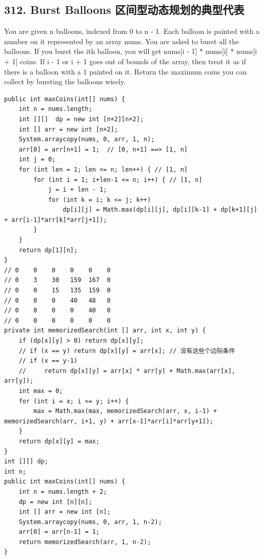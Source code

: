 \documentclass[9pt, b5paaper]{book}
\begin{document}
\subsection{312. Burst Balloons 区间型动态规划的典型代表}
\label{sec-1-3-3}
You are given n balloons, indexed from 0 to n - 1. Each balloon is painted with a number on it represented by an array nums. You are asked to burst all the balloons.
If you burst the ith balloon, you will get nums[i - 1] * nums[i] * nums[i + 1] coins. If i - 1 or i + 1 goes out of bounds of the array, then treat it as if there is a balloon with a 1 painted on it.
Return the maximum coins you can collect by bursting the balloons wisely.
\begin{verbatim}
public int maxCoins(int[] nums) {
    int n = nums.length;
    int [][]  dp = new int [n+2][n+2];
    int [] arr = new int [n+2];
    System.arraycopy(nums, 0, arr, 1, n);
    arr[0] = arr[n+1] = 1;  // [0, n+1] ==> [1, n]
    int j = 0;
    for (int len = 1; len <= n; len++) { // [1, n]
        for (int i = 1; i+len-1 <= n; i++) { // [1, n]
            j = i + len - 1;
            for (int k = i; k <= j; k++) 
                dp[i][j] = Math.max(dp[i][j], dp[i][k-1] + dp[k+1][j] + arr[i-1]*arr[k]*arr[j+1]);
        }
    }
    return dp[1][n];
}
// 0    0    0    0    0    0
// 0    3    30   159  167  0
// 0    0    15   135  159  0
// 0    0    0    40   48   0
// 0    0    0    0    40   0
// 0    0    0    0    0    0
private int memorizedSearch(int [] arr, int x, int y) {
    if (dp[x][y] > 0) return dp[x][y];
    // if (x == y) return dp[x][y] = arr[x]; // 没有这些个边际条件
    // if (x == y-1) 
    //     return dp[x][y] = arr[x] * arr[y] + Math.max(arr[x], arr[y]);
    int max = 0;
    for (int i = x; i <= y; i++) {
        max = Math.max(max, memorizedSearch(arr, x, i-1) + memorizedSearch(arr, i+1, y) + arr[x-1]*arr[i]*arr[y+1]);
    }
    return dp[x][y] = max;
}
int [][] dp;
int n;
public int maxCoins(int[] nums) {
    int n = nums.length + 2;
    dp = new int [n][n];
    int [] arr = new int [n];
    System.arraycopy(nums, 0, arr, 1, n-2);
    arr[0] = arr[n-1] = 1;
    return memorizedSearch(arr, 1, n-2);
}
\end{verbatim}
\end{document}
